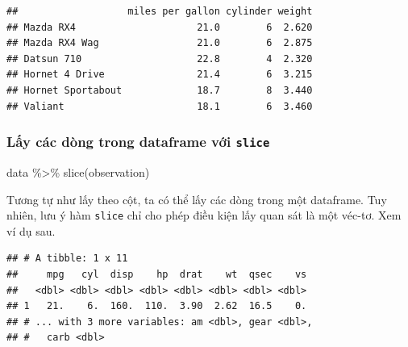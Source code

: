 \documentclass[]{krantz}
\makeatletter
\newenvironment{Shaded}{\begin{snugshade}}{\end{snugshade}}
\newcommand{\CommentTok}[1]{\textcolor[rgb]{0.37,0.37,0.37}{\textit{#1}}}
\newcommand{\DecValTok}[1]{\textcolor[rgb]{0.06,0.06,0.06}{#1}}
\newcommand{\KeywordTok}[1]{\textcolor[rgb]{0.27,0.27,0.27}{\textbf{#1}}}
\newcommand{\NormalTok}[1]{#1}
\newcommand{\OperatorTok}[1]{\textcolor[rgb]{0.43,0.43,0.43}{\textbf{#1}}}
\newcommand{\StringTok}[1]{\textcolor[rgb]{0.5,0.5,0.5}{#1}}
\renewenvironment{quote}{\begin{VF}}{\end{VF}}
\newenvironment{kframe}{%
\medskip{}
\setlength{\fboxsep}{.8em}
 \def\at@end@of@kframe{}%
 \ifinner\ifhmode%
  \def\at@end@of@kframe{\end{minipage}}%
  \begin{minipage}{\columnwidth}%
 \fi\fi%
 \def\FrameCommand##1{\hskip\@totalleftmargin \hskip-\fboxsep
 \colorbox{shadecolor}{##1}\hskip-\fboxsep
     \hskip-\linewidth \hskip-\@totalleftmargin \hskip\columnwidth}%
 \MakeFramed {\advance\hsize-\width
   \@totalleftmargin\z@ \linewidth\hsize
   \@setminipage}}%
 {\par\unskip\endMakeFramed%
 \at@end@of@kframe}
\renewenvironment{Shaded}{\begin{kframe}}{\end{kframe}}
\renewenvironment{Shaded}{\begin{snugshade}}{\end{snugshade}}
\renewcommand{\CommentTok}[1]{\textcolor[rgb]{0.56,0.35,0.01}{\textit{#1}}}
\renewcommand{\DecValTok}[1]{\textcolor[rgb]{0.00,0.00,0.81}{#1}}
\renewcommand{\KeywordTok}[1]{\textcolor[rgb]{0.13,0.29,0.53}{\textbf{#1}}}
\renewcommand{\NormalTok}[1]{#1}
\renewcommand{\OperatorTok}[1]{\textcolor[rgb]{0.81,0.36,0.00}{\textbf{#1}}}
\renewcommand{\StringTok}[1]{\textcolor[rgb]{0.31,0.60,0.02}{#1}}
\theoremstyle{definition}
\theoremstyle{definition}
\theoremstyle{definition}
\theoremstyle{remark}
\makeatother
\begin{document}
\begin{verbatim}
##                   miles per gallon cylinder weight
## Mazda RX4                     21.0        6  2.620
## Mazda RX4 Wag                 21.0        6  2.875
## Datsun 710                    22.8        4  2.320
## Hornet 4 Drive                21.4        6  3.215
## Hornet Sportabout             18.7        8  3.440
## Valiant                       18.1        6  3.460
\end{verbatim}

\hypertarget{ly-cac-dong-trong-dataframe-vi-slice}{%
\subsubsection{\texorpdfstring{Lấy các dòng trong dataframe với
\texttt{slice}}{Lấy các dòng trong dataframe với slice}}\label{ly-cac-dong-trong-dataframe-vi-slice}}

\begin{quote}
data \%\textgreater{}\% slice(observation)
\end{quote}

Tương tự như lấy theo cột, ta có thể lấy các dòng trong một dataframe.
Tuy nhiên, lưu ý hàm \texttt{slice} chỉ cho phép điều kiện lấy quan sát
là một véc-tơ. Xem ví dụ sau.

\begin{Shaded}
\end{Shaded}

\begin{verbatim}
## # A tibble: 1 x 11
##     mpg   cyl  disp    hp  drat    wt  qsec    vs
##   <dbl> <dbl> <dbl> <dbl> <dbl> <dbl> <dbl> <dbl>
## 1   21.    6.  160.  110.  3.90  2.62  16.5    0.
## # ... with 3 more variables: am <dbl>, gear <dbl>,
## #   carb <dbl>
\end{verbatim}

\begin{Shaded}
\end{Shaded}
\end{document}
